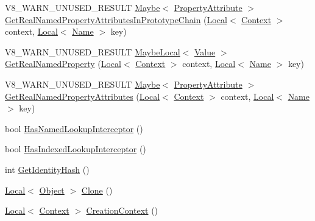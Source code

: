 \begin{DoxyCompactItemize}
\item 
V8\+\_\+\+W\+A\+R\+N\+\_\+\+U\+N\+U\+S\+E\+D\+\_\+\+R\+E\+S\+U\+LT \mbox{\hyperlink{classv8_1_1Maybe}{Maybe}}$<$ \mbox{\hyperlink{namespacev8_a05f25f935e108a1ea2d150e274602b87}{Property\+Attribute}} $>$ \mbox{\hyperlink{classv8_1_1Object_aab7c2e5c5659e95e97488e01b04bf3c8}{Get\+Real\+Named\+Property\+Attributes\+In\+Prototype\+Chain}} (\mbox{\hyperlink{classv8_1_1Local}{Local}}$<$ \mbox{\hyperlink{classv8_1_1Context}{Context}} $>$ context, \mbox{\hyperlink{classv8_1_1Local}{Local}}$<$ \mbox{\hyperlink{classv8_1_1Name}{Name}} $>$ key)
\item 
V8\+\_\+\+W\+A\+R\+N\+\_\+\+U\+N\+U\+S\+E\+D\+\_\+\+R\+E\+S\+U\+LT \mbox{\hyperlink{classv8_1_1MaybeLocal}{Maybe\+Local}}$<$ \mbox{\hyperlink{classv8_1_1Value}{Value}} $>$ \mbox{\hyperlink{classv8_1_1Object_aecec39cefb3e394e1696fe618862efec}{Get\+Real\+Named\+Property}} (\mbox{\hyperlink{classv8_1_1Local}{Local}}$<$ \mbox{\hyperlink{classv8_1_1Context}{Context}} $>$ context, \mbox{\hyperlink{classv8_1_1Local}{Local}}$<$ \mbox{\hyperlink{classv8_1_1Name}{Name}} $>$ key)
\item 
V8\+\_\+\+W\+A\+R\+N\+\_\+\+U\+N\+U\+S\+E\+D\+\_\+\+R\+E\+S\+U\+LT \mbox{\hyperlink{classv8_1_1Maybe}{Maybe}}$<$ \mbox{\hyperlink{namespacev8_a05f25f935e108a1ea2d150e274602b87}{Property\+Attribute}} $>$ \mbox{\hyperlink{classv8_1_1Object_a476c21f05ffc519252fad0ab46de33d7}{Get\+Real\+Named\+Property\+Attributes}} (\mbox{\hyperlink{classv8_1_1Local}{Local}}$<$ \mbox{\hyperlink{classv8_1_1Context}{Context}} $>$ context, \mbox{\hyperlink{classv8_1_1Local}{Local}}$<$ \mbox{\hyperlink{classv8_1_1Name}{Name}} $>$ key)
\item 
bool \mbox{\hyperlink{classv8_1_1Object_a1e96fcb9ee17101c0299ec68f2cf8610}{Has\+Named\+Lookup\+Interceptor}} ()
\item 
bool \mbox{\hyperlink{classv8_1_1Object_a278913bcd203434870ce5184a538a9af}{Has\+Indexed\+Lookup\+Interceptor}} ()
\item 
int \mbox{\hyperlink{classv8_1_1Object_ac1ece41e81a499920ec3a2a3471653bc}{Get\+Identity\+Hash}} ()
\item 
\mbox{\hyperlink{classv8_1_1Local}{Local}}$<$ \mbox{\hyperlink{classv8_1_1Object}{Object}} $>$ \mbox{\hyperlink{classv8_1_1Object_a5018c9d085aa71f65530cf1e073a04ad}{Clone}} ()
\item 
\mbox{\hyperlink{classv8_1_1Local}{Local}}$<$ \mbox{\hyperlink{classv8_1_1Context}{Context}} $>$ \mbox{\hyperlink{classv8_1_1Object_af6966283a7d7e20779961eed434db04d}{Creation\+Context}} ()
\item 

\end{DoxyCompactItemize}
